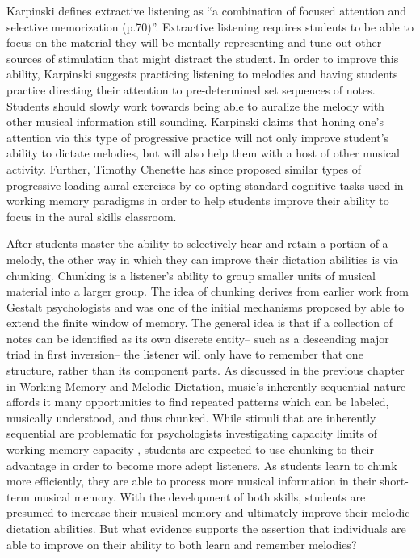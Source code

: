 \documentclass[12pt,]{book}
\begin{document}
Karpinski defines extractive listening as ``a combination of focused attention and selective memorization (p.70)''.
Extractive listening requires students to be able to focus on the material they will be mentally representing and tune out other sources of stimulation that might distract the student.
In order to improve this ability, Karpinski suggests practicing listening to melodies and having students practice directing their attention to pre-determined set sequences of notes.
Students should slowly work towards being able to auralize the melody with other musical information still sounding.
Karpinski claims that honing one's attention via this type of progressive practice will not only improve student's ability to dictate melodies, but will also help them with a host of other musical activity.
Further, Timothy Chenette has since proposed similar types of progressive loading aural exercises by co-opting standard cognitive tasks used in working memory paradigms \citep{chenetteReframingAuralSkills2019} in order to help students improve their ability to focus in the aural skills classroom.

After students master the ability to selectively hear and retain a portion of a melody, the other way in which they can improve their dictation abilities is via chunking.
Chunking is a listener's ability to group smaller units of musical material into a larger group.
The idea of chunking derives from earlier work from Gestalt psychologists and was one of the initial mechanisms proposed by \citet{millerMagicalNumberSeven1956} able to extend the finite window of memory.
The general idea is that if a collection of notes can be identified as its own discrete entity-- such as a descending major triad in first inversion-- the listener will only have to remember that one structure, rather than its component parts.
As discussed in the previous chapter in \protect\hyperlink{working-memory-and-melodic-dictation}{Working Memory and Melodic Dictation}, music's inherently sequential nature affords it many opportunities to find repeated patterns which can be labeled, musically understood, and thus chunked.
While stimuli that are inherently sequential are problematic for psychologists investigating capacity limits of working memory capacity \citep{cowanWorkingMemoryCapacity2005}, students are expected to use chunking to their advantage in order to become more adept listeners.
As students learn to chunk more efficiently, they are able to process more musical information in their short-term musical memory.
With the development of both skills, students are presumed to increase their musical memory and ultimately improve their melodic dictation abilities.
But what evidence supports the assertion that individuals are able to improve on their ability to both learn and remember melodies?
\end{document}
